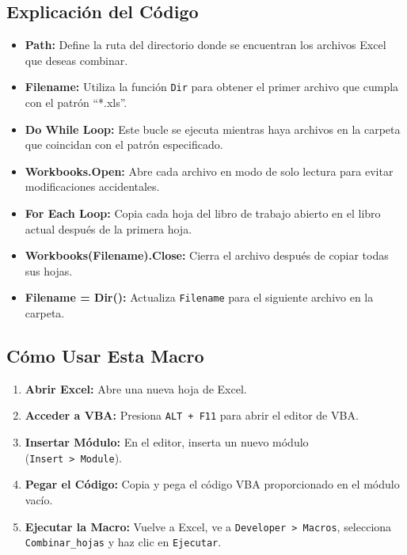 \documentclass[
  jou,
  floatsintext,
  longtable,
  a4paper,
  nolmodern,
  notxfonts,
  notimes,
  12pt,
  colorlinks=true,linkcolor=blue,citecolor=blue,urlcolor=blue]{apa7}
\providecommand{\tightlist}{%
  \setlength{\itemsep}{0pt}\setlength{\parskip}{0pt}}
\begin{document}
\subsection{Explicación del Código}\label{explicaciuxf3n-del-cuxf3digo}

\begin{itemize}
\tightlist
\item
  \textbf{Path:} Define la ruta del directorio donde se encuentran los
  archivos Excel que deseas combinar.
\item
  \textbf{Filename:} Utiliza la función \texttt{Dir} para obtener el
  primer archivo que cumpla con el patrón ``*.xls''.
\item
  \textbf{Do While Loop:} Este bucle se ejecuta mientras haya archivos
  en la carpeta que coincidan con el patrón especificado.
\item
  \textbf{Workbooks.Open:} Abre cada archivo en modo de solo lectura
  para evitar modificaciones accidentales.
\item
  \textbf{For Each Loop:} Copia cada hoja del libro de trabajo abierto
  en el libro actual después de la primera hoja.
\item
  \textbf{Workbooks(Filename).Close:} Cierra el archivo después de
  copiar todas sus hojas.
\item
  \textbf{Filename = Dir():} Actualiza \texttt{Filename} para el
  siguiente archivo en la carpeta.
\end{itemize}

\subsection{Cómo Usar Esta Macro}\label{cuxf3mo-usar-esta-macro}

\begin{enumerate}
\def\labelenumi{\arabic{enumi}.}
\tightlist
\item
  \textbf{Abrir Excel:} Abre una nueva hoja de Excel.
\item
  \textbf{Acceder a VBA:} Presiona \texttt{ALT\ +\ F11} para abrir el
  editor de VBA.
\item
  \textbf{Insertar Módulo:} En el editor, inserta un nuevo módulo
  (\texttt{Insert\ \textgreater{}\ Module}).
\item
  \textbf{Pegar el Código:} Copia y pega el código VBA proporcionado en
  el módulo vacío.
\item
  \textbf{Ejecutar la Macro:} Vuelve a Excel, ve a
  \texttt{Developer\ \textgreater{}\ Macros}, selecciona
  \texttt{Combinar\_hojas} y haz clic en \texttt{Ejecutar}.
\end{enumerate}
\end{document}
